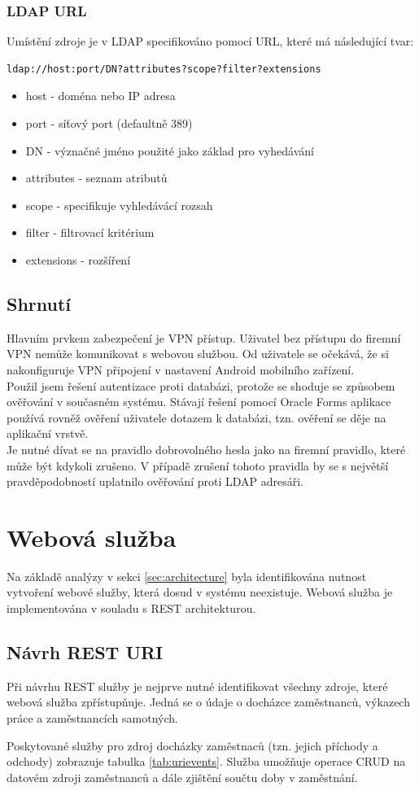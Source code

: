 \documentclass{diplomka}
\begin{document}
\subsection*{LDAP URL}
Umístění zdroje je v LDAP specifikováno pomocí URL, které má následující tvar:
\begin{verbatim}
ldap://host:port/DN?attributes?scope?filter?extensions
\end{verbatim}
\begin{itemize}[noitemsep,nolistsep]
\item host - doména nebo IP adresa
\item port - síťový port (defaultně 389)
\item DN - význačné jméno použité jako základ pro vyhedávání
\item attributes -  seznam atributů
\item scope - specifikuje vyhledávácí rozsah  
\item filter - filtrovací kritérium
\item extensions - rozšíření
\end{itemize}

\section{Shrnutí}
Hlavním prvkem zabezpečení je VPN přístup. Uživatel bez přístupu do firemní VPN nemůže komunikovat s webovou službou. Od uživatele se očekává, že si nakonfiguruje VPN připojení v nastavení Android mobilního zařízení.\\ \indent
Použil jsem řešení autentizace proti databázi, protože se shoduje se způsobem ověřování v současném systému. Stávají řešení pomocí Oracle Forms aplikace používá rovněž ověření uživatele dotazem k databázi, tzn. ověření se děje na aplikační vrstvě. \\ \indent
Je nutné dívat se na pravidlo dobrovolného hesla jako na firemní pravidlo, které může být kdykoli zrušeno. V případě zrušení tohoto pravidla by se s největší pravděpodobností uplatnilo ověřování proti LDAP adresáři. 

\chapter{Webová služba}
Na základě analýzy v sekci \ref{sec:architecture} byla identifikována nutnost vytvoření webové služby, která dosud v systému neexistuje. Webová služba je implementována v souladu s REST architekturou. 


\section{Návrh REST URI}
Při návrhu REST služby je nejprve nutné identifikovat všechny zdroje, které webová služba zpřístupňuje\cite{restdesign}. Jedná se o údaje o docházce zaměstnanců, výkazech práce a zaměstnancích samotných. 
 \par
Poskytované služby pro zdroj docházky zaměstnaců (tzn. jejich příchody a odchody) zobrazuje tabulka \ref{tab:urievents}. Služba umožňuje operace CRUD na datovém zdroji zaměstnanců a dále zjištění součtu doby v zaměstnání.
\end{document}
